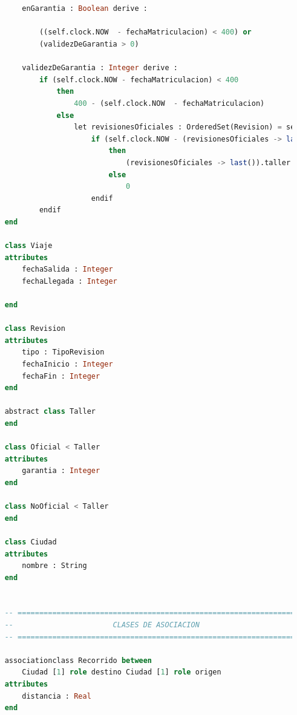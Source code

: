 \documentclass[12pt.a4paper]{article}
\begin{document}
\begin{lstlisting}[style = useNormal,language=SQL, caption={Modelo de Sistema de Coches en USE}]
            
    
        enGarantia : Boolean derive :             
            
            ((self.clock.NOW  - fechaMatriculacion) < 400) or
            (validezDeGarantia > 0)
    
        validezDeGarantia : Integer derive :      
            if (self.clock.NOW - fechaMatriculacion) < 400 
                then 
                    400 - (self.clock.NOW  - fechaMatriculacion) 
                else
                    let revisionesOficiales : OrderedSet(Revision) = self.revision -> select(rev | rev.taller.oclIsKindOf(Oficial)) -> sortedBy(rev | rev.fechaInicio) in
                        if (self.clock.NOW - (revisionesOficiales -> last()).fechaFin) < (revisionesOficiales -> last()).taller.oclAsType(Oficial).garantia
                            then
                                (revisionesOficiales -> last()).taller.oclAsType(Oficial).garantia - (self.clock.NOW - (revisionesOficiales -> last()).fechaFin)
                            else 
                                0
                        endif          
            endif 
    end 
    
    class Viaje
    attributes
        fechaSalida : Integer                     
        fechaLlegada : Integer                    
            
    end
    
    class Revision
    attributes
        tipo : TipoRevision                       
        fechaInicio : Integer                     
        fechaFin : Integer                        
    end
    
    abstract class Taller                         
    end
    
    class Oficial < Taller                       
    attributes
        garantia : Integer                        
    end
    
    class NoOficial < Taller                     
    end 
    
    class Ciudad
    attributes
        nombre : String                           
    end
    
    
    -- =====================================================================
    --                       CLASES DE ASOCIACION
    -- =====================================================================
    
    associationclass Recorrido between
        Ciudad [1] role destino Ciudad [1] role origen
    attributes
        distancia : Real                         
    end 
    

\end{lstlisting}
\end{document}
